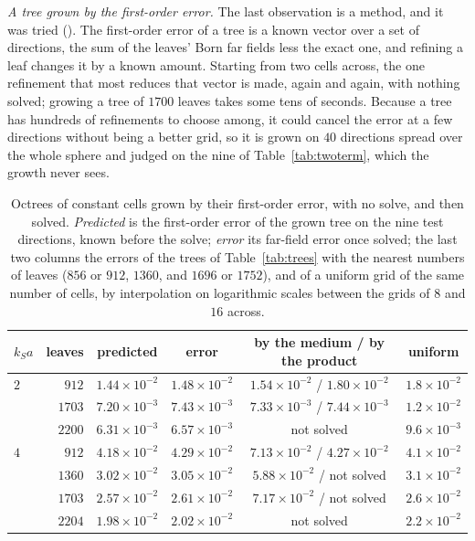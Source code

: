 \documentclass[11pt,a4paper]{article}
\begin{document}
\emph{A tree grown by the first-order error.} The last observation is a method, and it was tried
(). The first-order error of a tree is a known vector
over a set of directions, the sum of the leaves' Born far fields less the exact one, and refining a leaf
changes it by a known amount. Starting from two cells across, the one refinement that most reduces that
vector is made, again and again, with nothing solved; growing a tree of $1700$ leaves takes some tens of
seconds. Because a tree has hundreds of refinements to choose among, it could cancel the error at a few
directions without being a better grid, so it is grown on $40$ directions spread over the whole sphere
and judged on the nine of Table~\ref{tab:twoterm}, which the growth never sees.
\begin{table}[htbp]
\centering
\caption{Octrees of constant cells grown by their first-order error, with no solve, and then solved.
\emph{Predicted} is the first-order error of the grown tree on the nine test directions, known before the
solve; \emph{error} its far-field error once solved; the last two columns the errors of the trees of
Table~\ref{tab:trees} with the nearest numbers of leaves ($856$ or $912$, $1360$, and $1696$ or $1752$),
and of a uniform grid of the same number of cells, by interpolation on logarithmic scales between the
grids of $8$ and $16$ across.}\label{tab:greedy}
\small
\begin{tabular}{@{}lrcccc@{}}
\toprule
$k_Sa$ & leaves & predicted & error & by the medium / by the product & uniform \\
\midrule
$2$ & $912$  & $1.44\times10^{-2}$ & $1.48\times10^{-2}$ & $1.54\times10^{-2}$ / $1.80\times10^{-2}$ & $1.8\times10^{-2}$ \\
    & $1703$ & $7.20\times10^{-3}$ & $7.43\times10^{-3}$ & $7.33\times10^{-3}$ / $7.44\times10^{-3}$ & $1.2\times10^{-2}$ \\
    & $2200$ & $6.31\times10^{-3}$ & $6.57\times10^{-3}$ & not solved & $9.6\times10^{-3}$ \\
\midrule
$4$ & $912$  & $4.18\times10^{-2}$ & $4.29\times10^{-2}$ & $7.13\times10^{-2}$ / $4.27\times10^{-2}$ & $4.1\times10^{-2}$ \\
    & $1360$ & $3.02\times10^{-2}$ & $3.05\times10^{-2}$ & $5.88\times10^{-2}$ / not solved & $3.1\times10^{-2}$ \\
    & $1703$ & $2.57\times10^{-2}$ & $2.61\times10^{-2}$ & $7.17\times10^{-2}$ / not solved & $2.6\times10^{-2}$ \\
    & $2204$ & $1.98\times10^{-2}$ & $2.02\times10^{-2}$ & not solved & $2.2\times10^{-2}$ \\
\bottomrule
\end{tabular}
\end{table}
\end{document}
